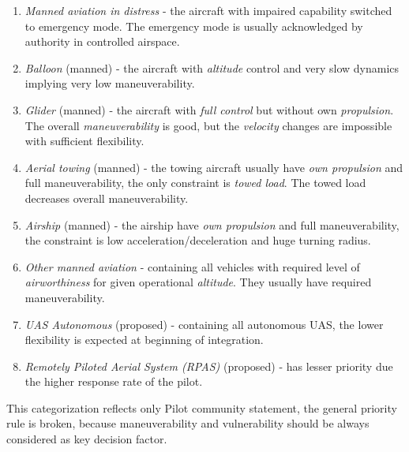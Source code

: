 \begin{enumerate}
    \item \emph{Manned aviation in distress} \cite{icaoAnnex2} -  the aircraft with impaired capability switched to emergency mode. The emergency mode is usually acknowledged by authority in controlled airspace. 
    
    \item \emph{Balloon} (manned) \cite{icaoAnnex2} - the aircraft with \emph{altitude} control and very slow dynamics implying very low maneuverability.  
    
    \item \emph{Glider} (manned) \cite{icaoAnnex2} - the aircraft with \emph{full control} but without own \emph{propulsion}. The overall \emph{maneuverability} is good, but the \emph{velocity} changes are impossible with sufficient flexibility.
    
    \item \emph{Aerial towing} (manned) \cite{icaoAnnex2} - the towing aircraft usually have \emph{own propulsion} and full maneuverability, the only constraint is \emph{towed load}. The towed load decreases overall maneuverability.
    
    \item \emph{Airship} (manned) \cite{icaoAnnex2} - the airship have \emph{own propulsion} and full maneuverability, the constraint is low acceleration/deceleration and huge turning radius.
    
    \item \emph{Other manned aviation} \cite{icaoAnnex2} - containing all vehicles with required level of \emph{airworthiness} for given operational \emph{altitude}. They usually have required maneuverability.
    
    \item \emph{UAS Autonomous} (proposed) \cite{santiago2015pilot} - containing all autonomous UAS, the lower flexibility is expected at beginning of integration.
    
    \item \emph{Remotely Piloted Aerial System (RPAS)} (proposed)  \cite{santiago2015pilot} - has lesser priority due the higher response rate of the pilot.
\end{enumerate}

\begin{note}
    This categorization reflects only Pilot community statement, the general priority rule is broken, because maneuverability and vulnerability  should be always considered as key decision factor. 
\end{note}

